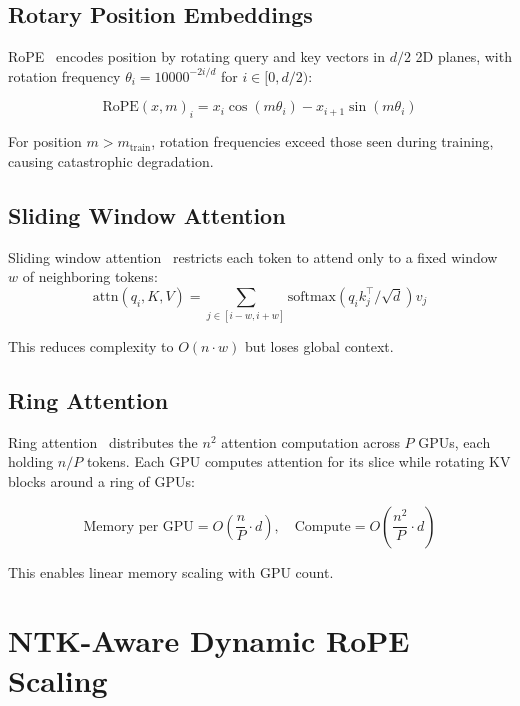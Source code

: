 \documentclass[11pt,a4paper]{article}
\begin{document}
\subsection{Rotary Position Embeddings}

RoPE~\cite{su2021rope} encodes position by rotating query and key vectors in
$d/2$ 2D planes, with rotation frequency $\theta_i = 10000^{-2i/d}$ for $i \in [0, d/2)$:

\begin{equation}
\text{RoPE}(x, m)_i = x_i \cos(m\theta_i) - x_{i+1}\sin(m\theta_i)
\end{equation}

For position $m > m_\text{train}$, rotation frequencies exceed those seen during
training, causing catastrophic degradation.

\subsection{Sliding Window Attention}

Sliding window attention~\cite{beltagy2020longformer} restricts each token to attend
only to a fixed window $w$ of neighboring tokens:
\begin{equation}
\text{attn}(q_i, K, V) = \sum_{j \in [i-w, i+w]} \text{softmax}(q_i k_j^\top/\sqrt{d}) v_j
\end{equation}

This reduces complexity to $O(n \cdot w)$ but loses global context.

\subsection{Ring Attention}

Ring attention~\cite{liu2023ring} distributes the $n^2$ attention computation across
$P$ GPUs, each holding $n/P$ tokens. Each GPU computes attention for its slice while
rotating KV blocks around a ring of GPUs:

\begin{equation}
\text{Memory per GPU} = O\left(\frac{n}{P} \cdot d\right), \quad \text{Compute} = O\left(\frac{n^2}{P} \cdot d\right)
\end{equation}

This enables linear memory scaling with GPU count.

\section{NTK-Aware Dynamic RoPE Scaling}
\end{document}
